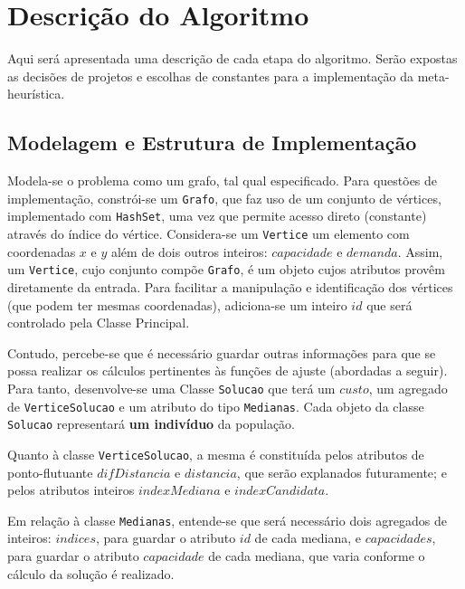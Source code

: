   \section{Descrição do Algoritmo}
	Aqui será apresentada uma descrição de cada etapa do algoritmo. Serão expostas as decisões de projetos e escolhas de constantes para a implementação da meta-heurística.

	\subsection{Modelagem e Estrutura de Implementação}
	Modela-se o problema como um grafo, tal qual especificado. Para questões de implementação, constrói-se um \verb|Grafo|, que faz uso de um conjunto de vértices, implementado com \verb|HashSet|, uma vez que permite acesso direto (constante) através do índice do vértice. Considera-se um \verb|Vertice| um elemento com coordenadas $x$ e $y$ além de dois outros inteiros: $capacidade$ e $demanda$. Assim, um \verb|Vertice|, cujo conjunto compõe \verb|Grafo|, é um objeto cujos atributos provêm diretamente da entrada. Para facilitar a manipulação e identificação dos vértices (que podem ter mesmas coordenadas), adiciona-se um inteiro $id$ que será controlado pela Classe Principal.

	Contudo, percebe-se que é necessário guardar outras informações para que se possa realizar os cálculos pertinentes às funções de ajuste (abordadas a seguir). Para tanto, desenvolve-se uma Classe
	\verb|Solucao| que terá um $custo$, um agregado de \verb|VerticeSolucao| e um atributo do tipo \verb|Medianas|. Cada objeto da classe \verb|Solucao| representará \textbf{um indivíduo} da população.

	Quanto à classe \verb|VerticeSolucao|, a mesma é constituída pelos atributos de ponto-flutuante $difDistancia$ e $distancia$, que serão explanados futuramente; e pelos atributos inteiros $indexMediana$ e $indexCandidata$.

	Em relação à classe \verb|Medianas|, entende-se que será necessário dois agregados de inteiros: $indices$, para guardar o atributo $id$ de cada mediana, e $capacidades$, para guardar o atributo $capacidade$ de cada mediana, que varia conforme o cálculo da solução é realizado.

